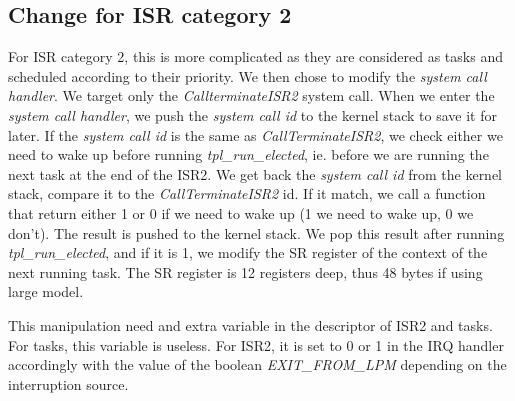 \documentclass[11pt, oneside]{article}
\begin{document}
\subsection{Change for ISR category 2}
For ISR category 2, this is more complicated as they are considered as tasks and scheduled according to their priority. We then chose to modify the \emph{system call handler}. We target only the \emph{CallterminateISR2} system call. When we enter the \emph{system call handler}, we push the \emph{system call id} to the kernel stack to save it for later. If the \emph{system call id} is the same as \emph{CallTerminateISR2}, we check either we need to wake up before running \emph{tpl\_run\_elected}, ie. before we are running the next task at the end of the ISR2. We get back the \emph{system call id} from the kernel stack, compare it to the \emph{CallTerminateISR2} id. If it match, we call a function that return either 1 or 0 if we need to wake up (1 we need to wake up, 0 we don't). The result is pushed to the kernel stack. We pop this result after running \emph{tpl\_run\_elected}, and if it is 1, we modify the SR register of the context of the next running task. The SR register is 12 registers deep, thus 48 bytes if using large model.

This manipulation need and extra variable in the descriptor of ISR2 and tasks. For tasks, this variable is useless. For ISR2, it is set to 0 or 1 in the IRQ handler accordingly with the value of the boolean \emph{EXIT\_FROM\_LPM} depending on the interruption source.
\end{document}
